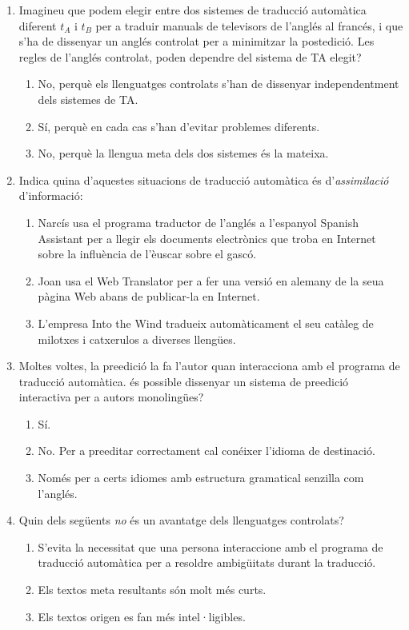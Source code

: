 \begin{enumerate}
\item Imagineu que podem elegir entre dos sistemes de traducció
  automàtica diferent $t_A$ i $t_B$ per a traduir manuals de
  televisors de l'anglés al francés, i que s'ha de dissenyar un anglés
  controlat per a minimitzar la postedició. Les regles de l'anglés
  controlat, poden dependre del sistema de TA elegit?
  \begin{enumerate}
  \item No, perquè els llenguatges controlats s'han de dissenyar
    independentment dels sistemes de TA.
  \item Sí, perquè en cada cas s'han d'evitar problemes diferents.
  \item No, perquè la llengua meta dels dos sistemes és la mateixa.
  \end{enumerate}

\item Indica quina d'aquestes situacions de traducció automàtica és
  d'\emph{assimilació} d'informació:
  \begin{enumerate}
  \item Narcís usa el programa traductor de l'anglés a l'espanyol
    Spanish Assistant per a llegir els documents electrònics que troba
    en Internet sobre la influència de l'èuscar sobre el gascó.
  \item Joan usa el Web Translator per a fer una versió en alemany de
    la seua pàgina Web abans de publicar-la en Internet.
  \item L'empresa Into the Wind tradueix automàticament el seu catàleg
    de milotxes i catxerulos a diverses llengües.
  \end{enumerate}

\item Moltes voltes, la preedició la fa l'autor quan interacciona amb
  el programa de traducció automàtica. és possible dissenyar un
  sistema de preedició interactiva per a autors monolingües?
  \begin{enumerate}
  \item Sí.
  \item No. Per a preeditar correctament cal conéixer l'idioma de
    destinació.
  \item Només per a certs idiomes amb estructura gramatical senzilla
    com l'anglés.
  \end{enumerate}

\item Quin dels següents \emph{no} és un avantatge dels llenguatges
  controlats?
  \begin{enumerate}
  \item S'evita la necessitat que una persona interaccione amb el
    programa de traducció automàtica per a resoldre ambigüitats durant
    la traducció.
  \item Els textos meta resultants són molt més curts.
  \item Els textos origen es fan més intel·ligibles.
\end{enumerate}


\end{enumerate}
